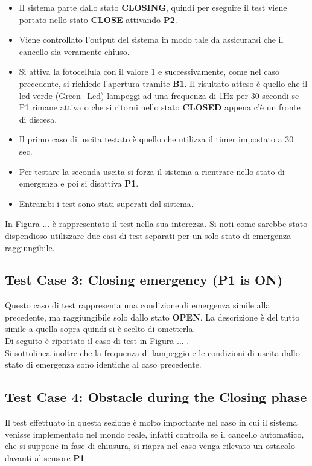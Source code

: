 \documentclass[12pt]{article}
\begin{document}
\begin{itemize}
    \item Il sistema parte dallo stato \textbf{CLOSING}, quindi per eseguire il test viene portato nello stato \textbf{CLOSE} attivando \textbf{P2}.
    \item Viene controllato l'output del sistema in modo tale da assicurarsi che il cancello sia veramente chiuso.
    \item Si attiva la fotocellula con il valore 1 e successivamente, come nel caso precedente, si richiede l'apertura tramite \textbf{B1}. Il risultato atteso è quello che il led verde (Green\_Led) lampeggi ad una frequenza di 1Hz per 30 secondi se P1 rimane attiva o che si ritorni nello stato \textbf{CLOSED} appena c'è un fronte di discesa.
    \item Il primo caso di uscita testato è quello che utilizza il timer impostato a 30 sec.
    \item Per testare la seconda uscita si forza il sistema a rientrare nello stato di emergenza e poi si disattiva \textbf{P1}.
    \item Entrambi i test sono stati superati dal sistema.
\end{itemize}

In Figura ... è rappresentato il test nella sua interezza. Si noti come sarebbe stato dispendioso utilizzare due casi di test separati per un solo stato di emergenza raggiungibile.

\subsection{Test Case 3: Closing emergency (P1 is ON)}

Questo caso di test rappresenta una condizione di emergenza simile alla precedente, ma raggiungibile solo dallo stato \textbf{OPEN}. La descrizione è del tutto simile a quella sopra quindi si è scelto di ometterla. \\
Di seguito è riportato il caso di test in Figura ... .\\
Si sottolinea inoltre che la frequenza di lampeggio e le condizioni di uscita dallo stato di emergenza sono identiche al caso precedente.


\subsection{Test Case 4: Obstacle during the Closing phase}

Il test effettuato in questa sezione è molto importante nel caso in cui il sistema venisse implementato nel mondo reale, infatti controlla se il cancello automatico, che si suppone in fase di chiusura, si riapra nel caso venga rilevato un ostacolo davanti al sensore \textbf{P1}
\end{document}
